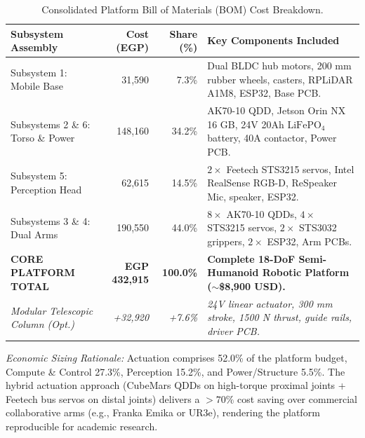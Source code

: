 \documentclass[10pt,a4paper]{article}
\begin{document}
\begin{table}[ht]
\vspace{-0.2em}
\centering\scriptsize
\caption{Consolidated Platform Bill of Materials (BOM) Cost Breakdown.}
\label{tab:bom_summary}
\vspace{-0.3em}
\begin{tabularx}{\textwidth}{@{}lrrp{7.5cm}@{}}
\toprule
\textbf{Subsystem Assembly} & \textbf{Cost (EGP)} & \textbf{Share (\%)} & \textbf{Key Components Included} \\
\midrule
Subsystem 1: Mobile Base & 31,590 & 7.3\% & Dual BLDC hub motors, 200 mm rubber wheels, casters, RPLiDAR A1M8, ESP32, Base PCB. \\
Subsystems 2 \& 6: Torso \& Power & 148,160 & 34.2\% & AK70-10 QDD, Jetson Orin NX 16 GB, 24V 20Ah $\text{LiFePO}_4$ battery, 40A contactor, Power PCB. \\
Subsystem 5: Perception Head & 62,615 & 14.5\% & $2\times$ Feetech STS3215 servos, Intel RealSense RGB-D, ReSpeaker Mic, speaker, ESP32. \\
Subsystems 3 \& 4: Dual Arms & 190,550 & 44.0\% & $8\times$ AK70-10 QDDs, $4\times$ STS3215 servos, $2\times$ STS3032 grippers, $2\times$ ESP32, Arm PCBs. \\
\midrule
\textbf{CORE PLATFORM TOTAL} & \textbf{EGP 432,915} & \textbf{100.0\%} & \textbf{Complete 18-DoF Semi-Humanoid Robotic Platform ($\sim$\$8,900 USD).} \\
\midrule
\emph{Modular Telescopic Column (Opt.)} & \emph{+32,920} & \emph{+7.6\%} & \emph{24V linear actuator, 300 mm stroke, 1500 N thrust, guide rails, driver PCB.} \\
\bottomrule
\end{tabularx}
\vspace{-0.5em}
\end{table}

\emph{Economic Sizing Rationale:} Actuation comprises 52.0\% of the platform budget, Compute \& Control 27.3\%, Perception 15.2\%, and Power/Structure 5.5\%. The hybrid actuation approach (CubeMars QDDs on high-torque proximal joints + Feetech bus servos on distal joints) delivers a $>70\%$ cost saving over commercial collaborative arms (e.g., Franka Emika or UR3e), rendering the platform reproducible for academic research.
\end{document}
